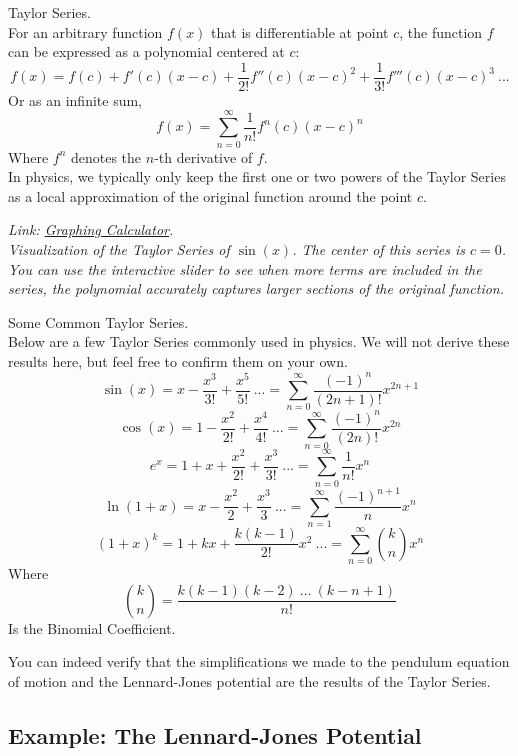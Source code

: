 \documentclass[11pt]{article}
\theoremstyle{gangnamstyle}{\newtheorem{definition}{Definition}[]}
\theoremstyle{gangnamstyle}{\newtheorem{example}{Example}[]}
\theoremstyle{gangnamstyle}{\newtheorem{problem}{Problem}[]}
\theoremstyle{gangnamstyle}{\newtheorem{warning}{Warning}[]}
\begin{document}
\begin{definition}
Taylor Series. \\
For an arbitrary function $f(x)$ that is differentiable at point $c$, the function $f$ can be expressed as a polynomial centered at $c$: 
\begin{equation}
f(x) = f(c) + f'(c)(x - c) + \frac{1}{2!}f''(c)(x - c)^2 + \frac{1}{3!}f'''(c)(x - c)^3 \ ...
\end{equation}
Or as an infinite sum, 
\begin{equation}
f(x) = \sum_{n = 0}^{\infty} \frac{1}{n!}f^n(c)(x - c)^n
\end{equation}
Where $f^n$ denotes the $n$-th derivative of $f$. \\
In physics, we typically only keep the first one or two powers of the Taylor Series as a local approximation of the original function around the point $c$. 
\end{definition}

\textit{Link: \href{https://www.desmos.com/calculator/lldzowzesu}{Graphing Calculator}. \\
Visualization of the Taylor Series of $\sin(x)$. The center of this series is $c = 0$. You can use the interactive slider to see when more terms are included in the series, the polynomial accurately captures larger sections of the original function.}

\begin{definition}
Some Common Taylor Series. \\
Below are a few Taylor Series commonly used in physics. We will not derive these results here, but feel free to confirm them on your own. 
\begin{equation}
\sin(x) = x - \frac{x^3}{3!} + \frac{x^5}{5!} \ ... = \sum_{n = 0}^{\infty} \frac{(-1)^n}{(2n + 1)!}x^{2n + 1}
\end{equation}
\begin{equation}
\cos(x) = 1 - \frac{x^2}{2!} + \frac{x^4}{4!} \ ... = \sum_{n = 0}^{\infty} \frac{(-1)^n}{(2n)!}x^{2n}
\end{equation}
\begin{equation}
e^x = 1 + x + \frac{x^2}{2!} + \frac{x^3}{3!} \ ... = \sum_{n = 0}^{\infty} \frac{1}{n!}x^n
\end{equation}
\begin{equation}
\ln(1 + x) = x - \frac{x^2}{2} + \frac{x^3}{3} \ ... = \sum_{n = 1}^{\infty} \frac{(-1)^{n + 1}}{n}x^n
\end{equation}
\begin{equation}
(1 + x)^k = 1 + kx + \frac{k(k - 1)}{2!}x^2 \ ... = \sum_{n = 0}^{\infty} \binom{k}{n} x^n
\end{equation}
Where
\[ \binom{k}{n} = \frac{k(k - 1)(k - 2) \ ... \ (k - n + 1)}{n!} \]
Is the Binomial Coefficient. 
\end{definition}

You can indeed verify that the simplifications we made to the pendulum equation of motion and the Lennard-Jones potential are the results of the Taylor Series. 

\pagebreak

\subsection{Example: The Lennard-Jones Potential}
\end{document}
